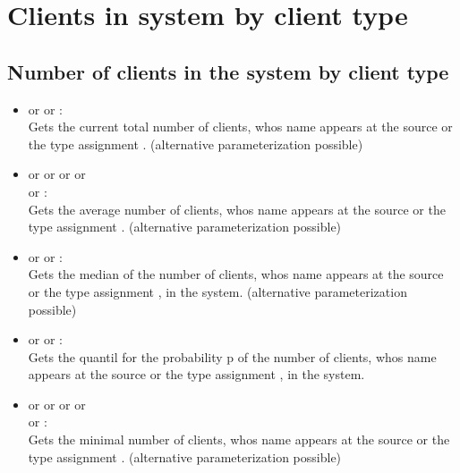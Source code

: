 \section{Clients in system by client type}



\subsection{Number of clients in the system by client type}

\begin{itemize}

\item
{} or  or :\\
Gets the current total number of clients, whos name appears at the source or the type assignment .
(alternative parameterization possible)

\item
{} or  or  or  or\\
 or :\\
Gets the average number of clients, whos name appears at the source or the type assignment .
(alternative parameterization possible)

\item
{} or  or :\\
Gets the median of the number of clients, whos name appears at the source or the type assignment , in the system.
(alternative parameterization possible)

\item
{} or  or :\\
Gets the quantil for the probability p of the number of clients, whos name appears at the source or the type assignment , in the system.

\item
{} or  or  or  or\\
 or :\\
Gets the minimal number of clients, whos name appears at the source or the type assignment .
(alternative parameterization possible)


\end{itemize}
